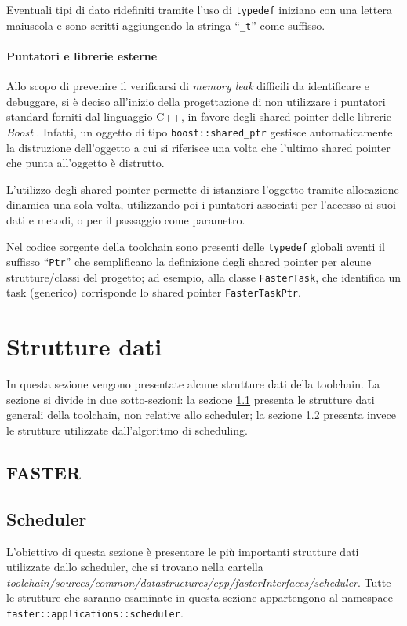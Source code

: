 Eventuali tipi di dato ridefiniti tramite l'uso di \verb+typedef+ iniziano 
con una lettera maiuscola e sono scritti aggiungendo la stringa ``\verb+_t+'' 
come suffisso.

\paragraph{Puntatori e librerie esterne}
Allo scopo di prevenire il verificarsi di \emph{memory leak} difficili da 
identificare e debuggare, si è deciso all'inizio della progettazione di non 
utilizzare i puntatori standard forniti dal linguaggio C++, in favore degli 
shared pointer delle librerie \emph{Boost} \cite{BoostLibrary, BoostSharedPtr}.
Infatti, un oggetto di tipo \verb+boost::shared_ptr+ gestisce automaticamente 
la distruzione dell'oggetto a cui si riferisce una volta che l'ultimo shared 
pointer che punta all'oggetto è distrutto.

L'utilizzo degli shared pointer permette di istanziare l'oggetto tramite 
allocazione dinamica una sola volta, utilizzando poi i puntatori associati per 
l'accesso ai suoi dati e metodi, o per il passaggio come parametro.

Nel codice sorgente della toolchain sono presenti delle \verb+typedef+ globali 
aventi il suffisso ``\verb+Ptr+'' che semplificano la definizione degli shared 
pointer per alcune strutture/classi del progetto; ad esempio, alla classe 
\verb+FasterTask+, che identifica un task (generico) corrisponde lo shared 
pointer \verb+FasterTaskPtr+.


\section{Strutture dati}
\label{sec:struttureDati}
In questa sezione vengono presentate alcune strutture dati della toolchain. La 
sezione si divide in due sotto-sezioni: la sezione 
\ref{subsec:struttureDatiFaster} presenta le strutture dati generali della 
toolchain, non relative allo scheduler; la sezione 
\ref{subsec:struttureDatiScheduler} presenta invece le strutture utilizzate 
dall'algoritmo di scheduling.


\subsection{\acs{FASTER}}
\label{subsec:struttureDatiFaster}


\subsection{Scheduler}
\label{subsec:struttureDatiScheduler}
L'obiettivo di questa sezione è presentare le più importanti strutture dati 
utilizzate dallo scheduler, che si trovano nella cartella 
\emph{toolchain/sources/common/datastructures/cpp/fasterInterfaces/scheduler}. 
Tutte le strutture che saranno esaminate in questa sezione appartengono al 
namespace \verb+faster::applications::scheduler+.

